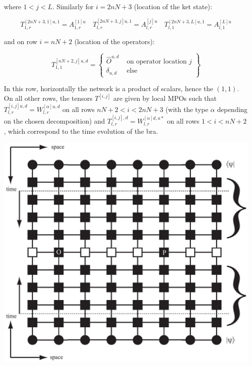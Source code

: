 \documentclass[12pt]{article}
\begin{document}
where $1<j<L$. Similarly for $i=2 n N+3$ (location of the ket state):


\begin{equation*}
T_{1, r}^{[2 n N+3,1] u, 1}=A_{1, r}^{[1] u} \quad T_{l, r}^{[2 n N+3, j] u, 1}=A_{l, r}^{[j] u} \quad T_{l, 1}^{[2 n N+3, L] u, 1}=A_{l, 1}^{[L] u} \tag{279}
\end{equation*}


and on row $i=n N+2$ (location of the operators):

\[
T_{1,1}^{[n N+2, j] u, d}=\left\{\begin{array}{ll}
\hat{O}^{u, d} & \text { on operator location } j  \tag{280}\\
\delta_{u, d} & \text { else }
\end{array}\right\}
\]

In this row, horizontally the network is a product of scalars, hence the $(1,1)$. On all other rows, the tensors $T^{[i, j]}$ are given by local MPOs such that $T_{l, r}^{[i, j] u, d}=W_{l, r}^{[\alpha] u, d}$ on all rows $n N+2<i<2 n N+3$ (with the type $\alpha$ depending on the chosen decomposition) and $T_{l, r}^{[i, j], d}=W_{l, r}^{[\alpha] d, u *}$ on all rows $1<i<n N+2$, which correspond to the time evolution of the bra.

\begin{center}
\includegraphics[max width=\textwidth]{2024_05_04_afc4ad226da9ccfe0ac8g-088}
\end{center}
\end{document}
